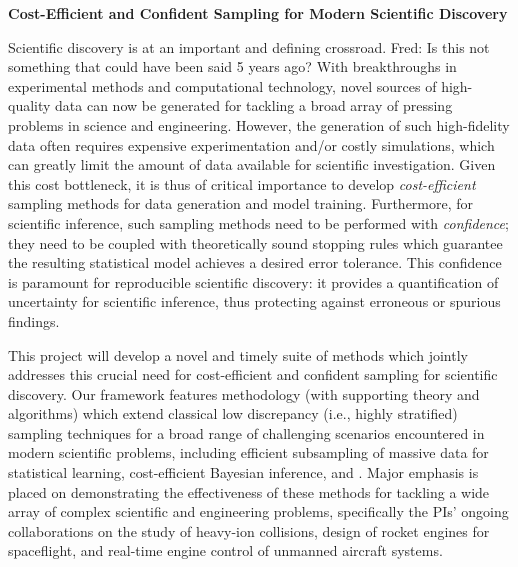 \documentclass[11pt]{NSFamsart}
\newcommand{\cmtS}[1]{{\color{blue}{(Simon: #1)}}}
\newcommand{\FJHNote}[1]{{\color{blue}Fred: #1}}
\begin{document}

\begin{center}
\Large \textbf{
Cost-Efficient and Confident Sampling for Modern Scientific Discovery
}
\end{center}
%
%



Scientific discovery is at an important and defining crossroad. \FJHNote{Is this not something that could have been said 5 years ago?} With breakthroughs in experimental methods and computational technology, novel sources of high-quality data can now be generated for tackling a broad array of pressing problems in science and engineering. However, the generation of such high-fidelity data often requires expensive experimentation and/or costly simulations, which can greatly limit the amount of data available for scientific investigation. Given this cost bottleneck, it is thus of critical importance to develop \textit{cost-efficient} sampling methods for data generation and model training. Furthermore, for scientific inference, such sampling methods need to be performed with \textit{confidence}; they need to be coupled with theoretically sound stopping rules which guarantee the resulting statistical model achieves a desired error tolerance. This confidence is paramount for reproducible scientific discovery: it provides a quantification of uncertainty for scientific inference, thus protecting against erroneous or spurious findings.

This project will develop a novel and timely suite of methods which jointly addresses this crucial need for cost-efficient and confident sampling for scientific discovery. Our framework features methodology (with supporting theory and algorithms) which extend classical low discrepancy (i.e., highly stratified) sampling techniques for a broad range of challenging scenarios encountered in modern scientific problems, including efficient subsampling of massive data for statistical learning, cost-efficient Bayesian inference, and \cmtS{...}. Major emphasis is placed on demonstrating the effectiveness of these methods for tackling a wide array of complex scientific and engineering problems, specifically the PIs' ongoing collaborations on the study of heavy-ion collisions, design of rocket engines for spaceflight, and real-time engine control of unmanned aircraft systems.
\end{document}

